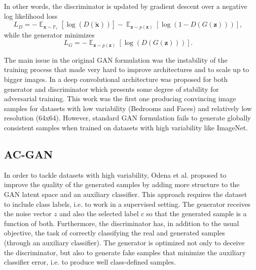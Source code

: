 \documentclass[times,twocolumn]{article}
\begin{document}
In other words, the discriminator is updated by gradient descent over a negative log likelihood loss
\begin{equation}\label{eq:d_loss}
L_D = -\mathop{\mathbb{E}}_{\bm{x} \sim  \mathbb{P}_r}[\log(D(\tilde{\bm{x}}))] - \mathop{\mathbb{E}}_{\bm{z} \sim p(\bm{z})}[\log(1-D(G(\bm{z})))],
\end{equation}
while the generator minimizes
\begin{equation}\label{eq:g_loss}
L_G = - \mathop{\mathbb{E}}_{\bm{z} \sim p(\bm{z})}[\log(D(G(\bm{z})))].
\end{equation}


The main issue in the original GAN formulation was the instability of the training process that made very hard to improve architectures and to scale up to bigger images.
In \cite{Radford2015} a deep convolutional architecture was proposed for both generator and discriminator which presents some degree of stability for adversarial training. This work was the first one producing convincing image samples for datasets with low
variability (Bedrooms and Faces) and relatively low resolution (64x64). However, standard GAN formulation fails to generate globally consistent samples when trained on datasets with high variability like ImageNet.
\subsection{AC-GAN}

In order to tackle datasets with high variability, Odena et al. \cite{Odena2017} proposed to improve the quality of the generated samples by adding more structure to the GAN latent space and an auxiliary classifier. This approach requires the dataset to include class labels, i.e. to work in a supervised setting. The generator receives the noise vector $z$ and also the selected label $c$ so that the generated sample is a function of both. Furthermore, the discriminator has, in addition to the usual objective, the task of correctly classifying the real and generated samples (through an auxiliary classifier). The generator is optimized not only to deceive the discriminator, but also to generate fake samples that minimize the auxiliary classifier error, i.e. to produce well class-defined samples.
\end{document}
